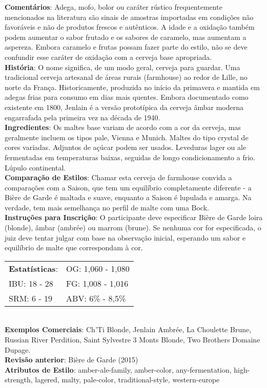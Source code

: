 \textbf{Comentários}: Adega, mofo, bolor ou caráter rústico frequentemente mencionados na literatura são sinais de amostras importadas em condições não favoráveis e não de produtos frescos e autênticos. A idade e a oxidação também podem aumentar o sabor frutado e os sabores de caramelo, mas aumentam a aspereza. Embora caramelo e frutas possam fazer parte do estilo, não se deve confundir esse caráter de oxidação com a cerveja base apropriada. \\
\textbf{História}: O nome significa, de um modo geral, cerveja para guardar. Uma tradicional cerveja artesanal de áreas rurais (farmhouse) ao redor de Lille, no norte da França. Historicamente, produzida no início da primavera e mantida em adegas frias para consumo em dias mais quentes. Embora documentado como existente em 1800, Jenlain é a versão prototípica da cerveja âmbar moderna engarrafada pela primeira vez na década de 1940. \\
\textbf{Ingredientes}: Os maltes base variam de acordo com a cor da cerveja, mas geralmente incluem os tipos pale, Vienna e Munich. Maltes do tipo crystal de cores variadas. Adjuntos de açúcar podem ser usados. Leveduras lager ou ale fermentadas em temperaturas baixas, seguidas de longo condicionamento a frio. Lúpulo continental. \\
\textbf{Comparação de Estilos}: Chamar esta cerveja de farmhouse convida a comparações com a Saison, que tem um equilíbrio completamente diferente - a Bière de Garde é maltada e suave, enquanto a Saison é lupulada e amarga. Na verdade, tem mais semelhança no perfil de malte com uma Bock. \\
\textbf{Instruções para Inscrição}: O participante deve especificar Bière de Garde loira (blonde), âmbar (ambrée) ou marrom (brune). Se nenhuma cor for especificada, o juiz deve tentar julgar com base na observação inicial, esperando um sabor e equilíbrio de malte que correspondam à cor. \\
\begin{tabular}{@{}p{35mm}p{35mm}@{}}
  \textbf{Estatísticas}: & OG: 1,060 - 1,080 \\
  IBU: 18 - 28  & FG: 1,008 - 1,016  \\
  SRM: 6 - 19  & ABV: 6\% - 8,5\%
\end{tabular}\\
\textbf{Exemplos Comerciais}: Ch’Ti Blonde, Jenlain Ambrée, La Choulette Brune, Russian River Perdition, Saint Sylvestre 3 Monts Blonde, Two Brothers Domaine Dupage. \\
\textbf{Revisão anterior}: Bière de Garde (2015) \\
\textbf{Atributos de Estilo}: amber-ale-family, amber-color, any-fermentation, high-strength, lagered, malty, pale-color, traditional-style, western-europe
